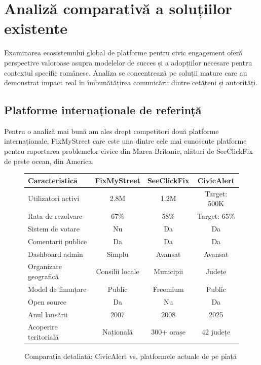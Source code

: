 \documentclass[12pt,a4paper]{report}
\begin{document}
\section{Analiză comparativă a soluțiilor existente}


Examinarea ecosistemului global de platforme pentru civic engagement oferă perspective valoroase asupra modelelor de succes și a adopțiilor necesare pentru contextul specific românesc. Analiza se concentrează pe soluții mature care au demonstrat impact real în îmbunătățirea comunicării dintre cetățeni și autorități.

\subsection{Platforme internaționale de referință}

Pentru o analiză mai bună am ales drept competitori două platforme internaționale, FixMyStreet care este una dintre cele mai cunoscute platforme pentru raportarea problemelor civice din Marea Britanie, alături de SeeClickFix de peste ocean, din America.

\begin{figure}[H]
\centering
\begin{tabular}{|l|c|c|c|}
\hline
\textbf{Caracteristică} & \textbf{FixMyStreet} & \textbf{SeeClickFix} & \textbf{CivicAlert} \\
\hline
Utilizatori activi & 2.8M & 1.2M & Target: 500K \\
\hline
Rata de rezolvare & 67\% & 58\% & Target: 65\% \\
\hline
Sistem de votare & Nu & Da & Da \\
\hline
Comentarii publice & Da & Da & Da \\
\hline
Dashboard admin & Simplu & Avansat & Avansat \\
\hline
Organizare geografică & Consilii locale & Municipii & Județe \\
\hline
Model de finanțare & Public & Freemium & Public \\
\hline
Open source & Da & Nu & Da \\
\hline
Anul lansării & 2007 & 2008 & 2025 \\
\hline
Acoperire teritorială & Națională & 300+ orașe & 42 județe \\
\hline
\end{tabular}
\caption{Comparația detaliată: CivicAlert vs. platformele actuale de pe piață}
\label{tab:comparatie_detaliata}
\end{figure}
\end{document}
